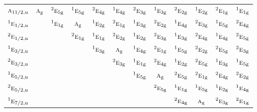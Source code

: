 \documentclass[10pt,a4paper]{article}
\numberwithin{equation}{section}
\newcommand{\irr}[1]{\text{\normalfont\scshape #1}}
\newcommand{\conjpair}[1]{{}^{#1}}
\newcommand{\ptag}[1]{\mathrm{#1}}
\begin{document}
{\begin{longtable}{@{}lccccccccccc@{}}
$\irr{a}_{11/2,\ptag{u}}$ & $\irr{a}_{\ptag{g}}$ & $\conjpair{2}\irr{e}_{5\ptag{g}}$ & $\conjpair{1}\irr{e}_{5\ptag{g}}$ & $\conjpair{2}\irr{e}_{4\ptag{g}}$ & $\conjpair{1}\irr{e}_{4\ptag{g}}$ & $\conjpair{2}\irr{e}_{3\ptag{g}}$ & $\conjpair{1}\irr{e}_{3\ptag{g}}$ & $\conjpair{2}\irr{e}_{2\ptag{g}}$ & $\conjpair{1}\irr{e}_{2\ptag{g}}$ & $\conjpair{2}\irr{e}_{1\ptag{g}}$ & $\conjpair{1}\irr{e}_{1\ptag{g}}$\\
$\conjpair{1}\irr{e}_{1/2,\ptag{u}}$ &  & $\conjpair{1}\irr{e}_{1\ptag{g}}$ & $\irr{a}_{\ptag{g}}$ & $\conjpair{1}\irr{e}_{2\ptag{g}}$ & $\conjpair{2}\irr{e}_{1\ptag{g}}$ & $\conjpair{1}\irr{e}_{3\ptag{g}}$ & $\conjpair{2}\irr{e}_{2\ptag{g}}$ & $\conjpair{1}\irr{e}_{4\ptag{g}}$ & $\conjpair{2}\irr{e}_{3\ptag{g}}$ & $\conjpair{1}\irr{e}_{5\ptag{g}}$ & $\conjpair{2}\irr{e}_{4\ptag{g}}$\\
$\conjpair{2}\irr{e}_{1/2,\ptag{u}}$ &  &  & $\conjpair{2}\irr{e}_{1\ptag{g}}$ & $\conjpair{1}\irr{e}_{1\ptag{g}}$ & $\conjpair{2}\irr{e}_{2\ptag{g}}$ & $\conjpair{1}\irr{e}_{2\ptag{g}}$ & $\conjpair{2}\irr{e}_{3\ptag{g}}$ & $\conjpair{1}\irr{e}_{3\ptag{g}}$ & $\conjpair{2}\irr{e}_{4\ptag{g}}$ & $\conjpair{1}\irr{e}_{4\ptag{g}}$ & $\conjpair{2}\irr{e}_{5\ptag{g}}$\\
$\conjpair{1}\irr{e}_{3/2,\ptag{u}}$ &  &  &  & $\conjpair{1}\irr{e}_{3\ptag{g}}$ & $\irr{a}_{\ptag{g}}$ & $\conjpair{1}\irr{e}_{4\ptag{g}}$ & $\conjpair{2}\irr{e}_{1\ptag{g}}$ & $\conjpair{1}\irr{e}_{5\ptag{g}}$ & $\conjpair{2}\irr{e}_{2\ptag{g}}$ & $\conjpair{2}\irr{e}_{5\ptag{g}}$ & $\conjpair{2}\irr{e}_{3\ptag{g}}$\\
$\conjpair{2}\irr{e}_{3/2,\ptag{u}}$ &  &  &  &  & $\conjpair{2}\irr{e}_{3\ptag{g}}$ & $\conjpair{1}\irr{e}_{1\ptag{g}}$ & $\conjpair{2}\irr{e}_{4\ptag{g}}$ & $\conjpair{1}\irr{e}_{2\ptag{g}}$ & $\conjpair{2}\irr{e}_{5\ptag{g}}$ & $\conjpair{1}\irr{e}_{3\ptag{g}}$ & $\conjpair{1}\irr{e}_{5\ptag{g}}$\\
$\conjpair{1}\irr{e}_{5/2,\ptag{u}}$ &  &  &  &  &  & $\conjpair{1}\irr{e}_{5\ptag{g}}$ & $\irr{a}_{\ptag{g}}$ & $\conjpair{2}\irr{e}_{5\ptag{g}}$ & $\conjpair{2}\irr{e}_{1\ptag{g}}$ & $\conjpair{2}\irr{e}_{4\ptag{g}}$ & $\conjpair{2}\irr{e}_{2\ptag{g}}$\\
$\conjpair{2}\irr{e}_{5/2,\ptag{u}}$ &  &  &  &  &  &  & $\conjpair{2}\irr{e}_{5\ptag{g}}$ & $\conjpair{1}\irr{e}_{1\ptag{g}}$ & $\conjpair{1}\irr{e}_{5\ptag{g}}$ & $\conjpair{1}\irr{e}_{2\ptag{g}}$ & $\conjpair{1}\irr{e}_{4\ptag{g}}$\\
$\conjpair{1}\irr{e}_{7/2,\ptag{u}}$ &  &  &  &  &  &  &  & $\conjpair{2}\irr{e}_{4\ptag{g}}$ & $\irr{a}_{\ptag{g}}$ & $\conjpair{2}\irr{e}_{3\ptag{g}}$ & $\conjpair{2}\irr{e}_{1\ptag{g}}$\\

\end{longtable}}
\end{document}
